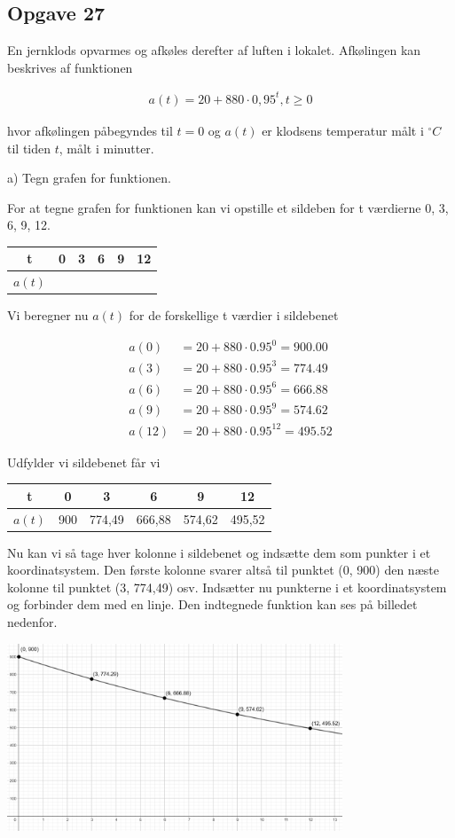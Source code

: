 \subsection{Opgave 27}

En jernklods opvarmes og afkøles derefter af luften i lokalet. Afkølingen kan beskrives af funktionen

\begin{align*}
    a(t) = 20 + 880\cdot 0,95^t, t\geq 0
\end{align*}

hvor afkølingen påbegyndes til $t=0$ og $a(t)$ er klodsens temperatur målt i $^{\circ}C$ til tiden $t$, målt i minutter.

a) Tegn grafen for funktionen.

\ans
For at tegne grafen for funktionen kan vi opstille et sildeben for t værdierne 0, 3, 6, 9, 12.

\begin{tabular}{c|c|c|c|c|c}
    t & 0 & 3 & 6 & 9 & 12 \\\hline
    $a(t)$ & & & & &
\end{tabular}

Vi beregner nu $a(t)$ for de forskellige t værdier i sildebenet

\begin{align*}
    a(0) &= 20 + 880 \cdot 0.95^0 = 900.00 \\
    a(3) &= 20 + 880 \cdot 0.95^3 = 774.49 \\
    a(6) &= 20 + 880 \cdot 0.95^6 = 666.88 \\
    a(9) &= 20 + 880 \cdot 0.95^9 = 574.62 \\
    a(12) &= 20 + 880 \cdot 0.95^{12} = 495.52
\end{align*}

Udfylder vi sildebenet får vi

\begin{tabular}{c|c|c|c|c|c}
    t & 0 & 3 & 6 & 9 & 12 \\\hline
    $a(t)$ & 900 & 774,49 & 666,88 & 574,62 & 495,52
\end{tabular}

Nu kan vi så tage hver kolonne i sildebenet og indsætte dem som punkter i et koordinatsystem.
Den første kolonne svarer altså til punktet (0, 900) den næste kolonne til punktet (3, 774,49) osv.
Indsætter nu punkterne i et koordinatsystem og forbinder dem med en linje.
Den indtegnede funktion kan ses på billedet nedenfor.

\includegraphics[width=10cm]{Opgave_21-30/Opgave_27/27.png}


